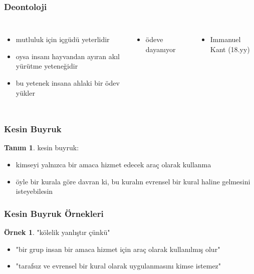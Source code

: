 \documentclass[dvipsnames]{beamer}
\theoremstyle{definition}
\newtheorem{tanim}[theorem]{Tanım}
\theoremstyle{example}
\newtheorem{ornek}[theorem]{Örnek}
\theoremstyle{plain}
\begin{document}
\begin{frame}
  \frametitle{Deontoloji}

  \begin{columns}
    \begin{itemize}
      \item mutluluk için içgüdü yeterlidir
      \item oysa insanı hayvandan ayıran akıl yürütme yeteneğidir
      \item bu yetenek insana ahlaki bir ödev yükler
    \end{itemize}

    \begin{itemize}
      \item ödeve dayanıyor
    \end{itemize}

    \begin{center}
    \end{center}
    \begin{itemize}
      \item Immanuel Kant (18.yy)
    \end{itemize}
  \end{columns}
\end{frame}

\begin{frame}
  \frametitle{Kesin Buyruk}

  \begin{tanim}
    \alert{kesin buyruk}:

    \begin{itemize}
      \item kimseyi yalnızca bir amaca hizmet edecek araç olarak kullanma

      \item öyle bir kurala göre davran ki, bu kuralın evrensel bir kural haline
        gelmesini isteyebilesin
    \end{itemize}
  \end{tanim}
\end{frame}

\begin{frame}
  \frametitle{Kesin Buyruk Örnekleri}

  \begin{ornek}
    \alert{"kölelik yanlıştır çünkü"}

    \begin{itemize}
      \item "bir grup insan bir amaca hizmet için araç olarak kullanılmış olur"
      \item "tarafsız ve evrensel bir kural olarak uygulanmasını kimse istemez"
    \end{itemize}
  \end{ornek}
\end{frame}
\end{document}
